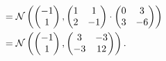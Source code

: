 \documentclass[a4paper]{article}
\begin{document}
\begin{enumerate}
\begin{align*}
        &= \mathcal{N}\left( \left(\begin{matrix}-1 \\ 1\end{matrix}\right), \left(\begin{matrix}1 & 1 \\ 2 & -1\end{matrix}\right) \cdot \left(\begin{matrix}0 & 3 \\ 3 & -6\end{matrix}\right) \right)\\
        &= \mathcal{N}\left( \left(\begin{matrix}-1 \\ 1\end{matrix}\right), \left(\begin{matrix}3 & -3 \\ -3 & 12\end{matrix}\right) \right)\text{.}
    \end{align*}
\end{enumerate}
\end{document}
